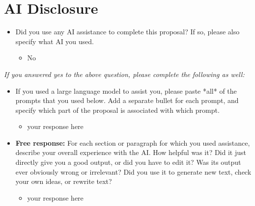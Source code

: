 \section{AI Disclosure}
\begin{itemize}
    \item Did you use any AI assistance to complete this proposal? If so, please also specify what AI you used.
    \begin{itemize}
        \item No
    \end{itemize}
\end{itemize}

\noindent\textit{If you answered yes to the above question, please complete the following as well:}

\begin{itemize}
    \item  If you used a large language model to assist you, please paste *all* of the prompts that you used below. Add a separate bullet for each prompt, and specify which part of the proposal is associated with which prompt.
    \begin{itemize}
        \item your response here
    \end{itemize}
    \item \textbf{Free response:} For each section or paragraph for which you used assistance, describe your overall experience with the AI. How helpful was it? Did it just directly give you a good output, or did you have to edit it? Was its output ever obviously wrong or irrelevant? Did you use it to generate new text, check your own ideas, or rewrite text?
    \begin{itemize}
        \item your response here
    \end{itemize}
\end{itemize}